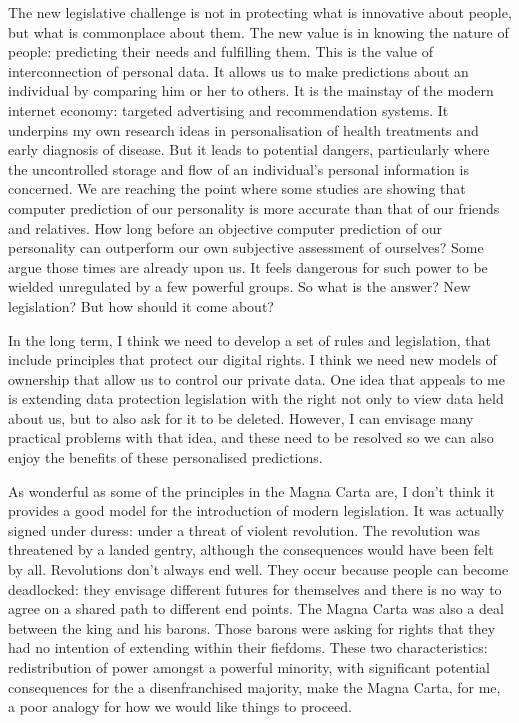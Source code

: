 \documentclass[a4paper]{caesar_book}
\begin{document}
The new legislative challenge is not in protecting what is innovative about people, but what is commonplace about them. The new value is in knowing the nature of people: predicting their needs and fulfilling them. This is the value of interconnection of personal data. It allows us to make predictions about an individual by comparing him or her to others. It is the mainstay of the modern internet economy: targeted advertising and recommendation systems. It underpins my own research ideas in personalisation of health treatments and early diagnosis of disease. But it leads to potential dangers, particularly where the uncontrolled storage and flow of an individual’s personal information is concerned. We are reaching the point where some studies are showing that computer prediction of our personality is more accurate than that of our friends and relatives. How long before an objective computer prediction of our personality can outperform our own subjective assessment of ourselves? Some argue those times are already upon us. It feels dangerous for such power to be wielded unregulated by a few powerful groups. So what is the answer? New legislation? But how should it come about?

In the long term, I think we need to develop a set of rules and legislation, that include principles that protect our digital rights. I think we need new models of ownership that allow us to control our private data. One idea that appeals to me is extending data protection legislation with the right not only to view data held about us, but to also ask for it to be deleted. However, I can envisage many practical problems with that idea, and these need to be resolved so we can also enjoy the benefits of these personalised predictions.

As wonderful as some of the principles in the Magna Carta are, I don’t think it provides a good model for the introduction of modern legislation. It was actually signed under duress: under a threat of violent revolution. The revolution was threatened by a landed gentry, although the consequences would have been felt by all. Revolutions don’t always end well. They occur because people can become deadlocked: they envisage different futures for themselves and there is no way to agree on a shared path to different end points. The Magna Carta was also a deal between the king and his barons. Those barons were asking for rights that they had no intention of extending within their fiefdoms. These two characteristics: redistribution of power amongst a powerful minority, with significant potential consequences for the a disenfranchised majority, make the Magna Carta, for me, a poor analogy for how we would like things to proceed.
\end{document}
